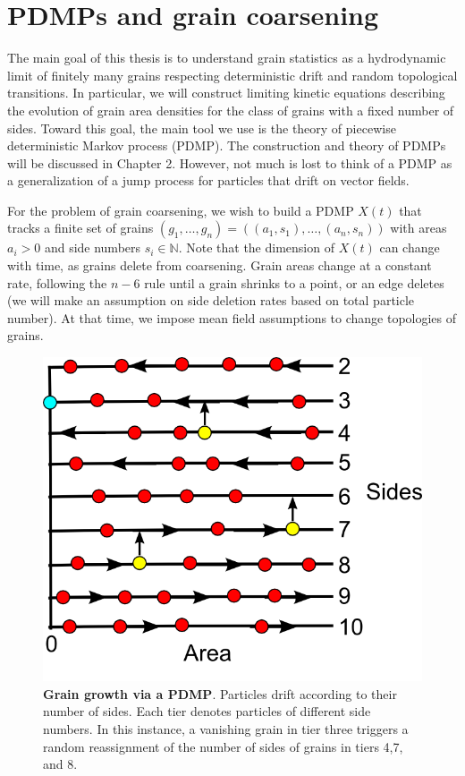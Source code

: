\section{PDMPs and grain coarsening}\label{pdmpgraincoarse}
The main goal of this thesis is to understand grain  statistics as a hydrodynamic limit of finitely many grains respecting deterministic drift and random topological transitions.  In particular, we will  construct limiting kinetic equations describing the evolution of grain area densities for the class of grains with a fixed number of sides.   Toward this goal, the main tool we use is the theory of piecewise deterministic Markov process (PDMP).  The construction and theory of PDMPs will be discussed in Chapter 2.  However, not much is lost to think of a PDMP  as a generalization of a jump process for particles that drift on vector fields.    

For the problem of grain coarsening, we wish to build a PDMP $X(t)$ that tracks a finite set of grains $(g_1,\dots, g_n) =  ((a_1,s_1), \dots, (a_n,s_n))$ with areas $a_i>0$ and side numbers $s_i \in \mathbb N.$  
Note that the dimension of $X(t)$ can change with time, as grains delete from coarsening. Grain areas change at a constant rate, following the $n-6$ rule until a grain shrinks to a point, or an edge deletes (we will make an assumption on side deletion rates based on total particle number).  At that time, we impose mean field assumptions to change topologies of grains. 

 

 
\begin{figure}  
\begin{centering} 
 \includegraphics[width = .4\textwidth]{graintops.png} 
 \caption{\textbf{Grain growth via a PDMP}. Particles drift according to their number of sides. Each tier denotes particles of different side numbers. In this instance, a vanishing grain in tier three triggers a  random reassignment  of the number of sides of grains in tiers 4,7, and 8.}
\end{centering}
\end{figure}

